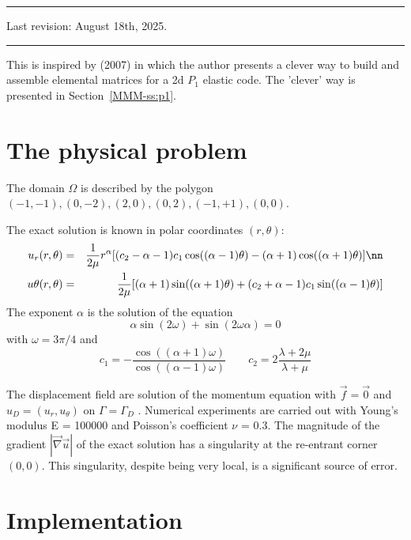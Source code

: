 \par\noindent\rule{\textwidth}{0.4pt}

Last revision: August 18th, 2025.

\par\noindent\rule{\textwidth}{0.4pt}


This \stone is inspired by \textcite{koko07} (2007) in which the author presents 
a clever way to build and assemble elemental matrices for a 2d $P_1$ elastic code.
The 'clever' way is presented in Section~\ref{MMM-ss:p1}.

\section*{The physical problem}

The domain $\Omega$ is described by the polygon
$(-1,-1), (0,-2), (2, 0), (0, 2), (-1,+1), (0, 0)$.

The exact solution is known in polar coordinates $(r,\theta)$:
\begin{eqnarray}
u_r(r,\theta)
&=&\frac{1}{2\mu} r^\alpha 
[(c_2 - \alpha - 1)c_1 \cos((\alpha - 1)\theta) 
- (\alpha + 1) \cos((\alpha + 1)\theta)] \nn\\
u\theta(r,\theta)&=& 
\frac{1}{2\mu}
[(\alpha + 1) \sin((\alpha + 1)\theta) 
+ (c_2 + \alpha - 1)c_1 \sin((\alpha - 1)\theta)]
\end{eqnarray}
The exponent $\alpha$ is the solution of the equation
\[
\alpha \sin(2\omega) + \sin(2\omega \alpha ) = 0
\]
with $\omega=3\pi/4$ and
\[
c_1 = -\frac{\cos((\alpha+1)\omega)}{\cos((\alpha-1)\omega)}
\qquad
c_2 = 2 \frac{\lambda + 2\mu}{\lambda+\mu}
\]


The displacement field are solution of the momentum equation 
with $\vec{f} = \vec{0}$ and $u_D = (u_r , u_\theta )$ on 
$\Gamma = \Gamma_D$ . Numerical
experiments are carried out with Young’s modulus E = 100000 and Poisson’s coefficient $\nu$ = 0.3. The magnitude of
the gradient $|\vec\nabla \vec{u}|$ of the exact solution 
has a singularity at the re-entrant corner $(0,0)$. This singularity,
despite being very local, is a significant source of error.

\section*{Implementation}

